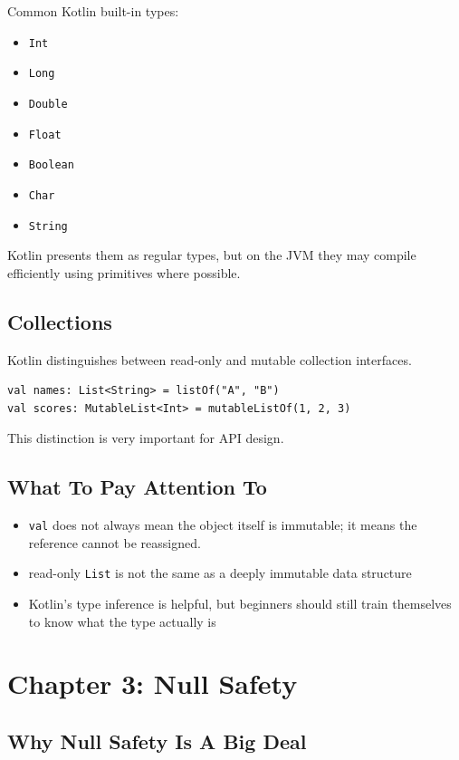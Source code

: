 \documentclass[11pt,a4paper]{article}
\begin{document}
Common Kotlin built-in types:
\begin{itemize}
    \item \texttt{Int}
    \item \texttt{Long}
    \item \texttt{Double}
    \item \texttt{Float}
    \item \texttt{Boolean}
    \item \texttt{Char}
    \item \texttt{String}
\end{itemize}

Kotlin presents them as regular types, but on the JVM they may compile efficiently using primitives where possible.

\subsection{Collections}

Kotlin distinguishes between read-only and mutable collection interfaces.

\begin{lstlisting}[style=kazekotlin]
val names: List<String> = listOf("A", "B")
val scores: MutableList<Int> = mutableListOf(1, 2, 3)
\end{lstlisting}

This distinction is very important for API design.

\subsection{What To Pay Attention To}

\begin{itemize}
    \item \texttt{val} does not always mean the object itself is immutable; it means the reference cannot be reassigned.
    \item read-only \texttt{List} is not the same as a deeply immutable data structure
    \item Kotlin's type inference is helpful, but beginners should still train themselves to know what the type actually is
\end{itemize}

\section{Chapter 3: Null Safety}

\subsection{Why Null Safety Is A Big Deal}
\end{document}
